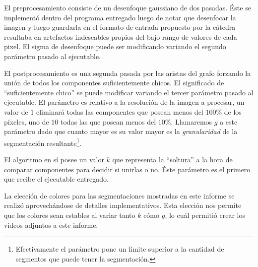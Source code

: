El preprocesamiento consiste de un desenfoque gaussiano de dos pasadas. Éste se
implementó dentro del programa entregado luego de notar que desenfocar la
imagen y luego guardarla en el formato de entrada propuesto por la cátedra
resultaba en artefactos indeseables propios del bajo rango de valores de cada
pixel. El sigma de desenfoque puede ser modificando variando el segundo
parámetro pasado al ejecutable.

El postprocesamiento es una segunda pasada por las aristas del grafo forzando
la unión de todos los componentes suficientemente chicos. El significado de
``suficientemente chico'' se puede modificar variando el tercer parámetro
pasado al ejecutable. El parámetro es relativo a la resolución de la imagen a
procesar, un valor de $1$ eliminará todas las componentes que posean menos del
$100\%$ de los píxeles, uno de $10$ todas las que posean menos del $10\%$.
Llamaremos $g$ a este parámetro dado que cuanto mayor es su valor mayor es la
\emph{granularidad} de la segmentación resultante\footnote{Efectivamente el
parámetro pone un límite superior a la cantidad de segmentos que puede tener la
segmentación.}.

El algoritmo en sí posee un valor $k$ que representa la ``soltura'' a la hora
de comparar componentes para decidir si unirlas o no. Éste parámetro es el
primero que recibe el ejecutable entregado.

La elección de colores para las segmentaciones mostradas en este informe se
realizó aprovechándose de detalles implementativos. Esta elección nos permite
que los colores sean estables al variar tanto $k$ cómo $g$, lo cuál permitió
crear los videos adjuntos a este informe.
